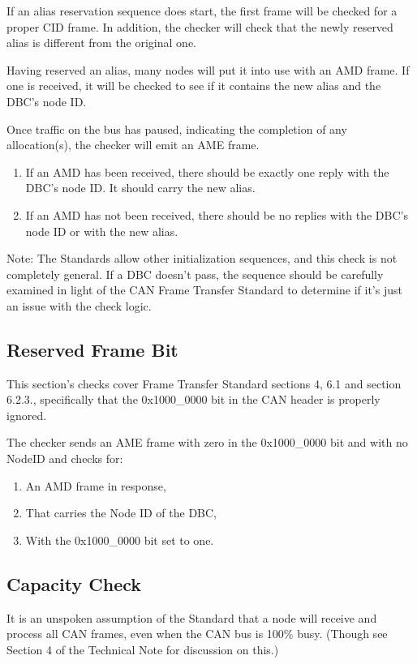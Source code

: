 If an alias reservation sequence does start, 
the first frame will be checked for a proper CID frame.  
In addition, the checker will check that the 
newly reserved alias is different from the original one.

Having reserved an alias, many nodes will put it into use with an AMD frame. 
If one is received, it will be checked to see if it contains the new alias
and the DBC's node ID.

Once traffic on the bus has paused, indicating the completion of 
any allocation(s), the checker will emit an AME frame.
\begin{enumerate}
\item If an AMD has been received, there should be exactly one
        reply with the DBC's node ID.  It should carry the new alias.
\item If an AMD has not been received, there should be no 
        replies with the DBC's node ID or with the new alias.
\end{enumerate}

Note: The Standards allow other initialization sequences, and this check
is not completely general.  If a DBC doesn't pass, the sequence should
be carefully examined in light of the CAN Frame Transfer Standard
to determine if it's just an issue with the check logic.
\subsection{Reserved Frame Bit}

This section's checks cover Frame Transfer Standard sections 4, 6.1 and section 6.2.3., 
specifically that the 0x1000\_0000 bit in the CAN header is properly
ignored.

The checker sends an AME frame with zero in the 0x1000\_0000 bit
and with no NodeID and checks for:
\begin{enumerate}
\item An AMD frame in response,
\item That carries the Node ID of the DBC,
\item With the 0x1000\_0000 bit set to one.
\end{enumerate}

\subsection{Capacity Check}

It is an unspoken assumption of the Standard that a node will receive and
process all CAN frames, even when the CAN bus is 100\% busy. (Though see Section 4
of the Technical Note for discussion on this.)


